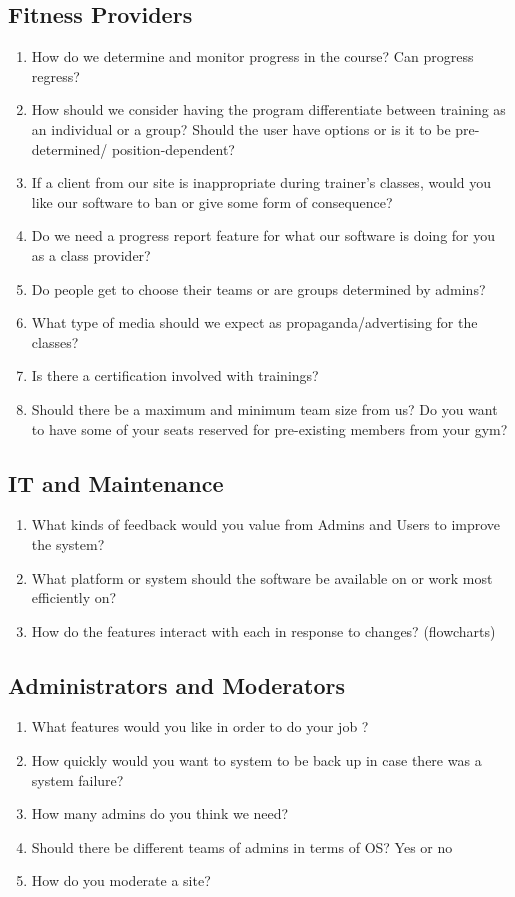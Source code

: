 \documentclass[12pt]{article}
\begin{document}
\subsection{Fitness Providers}
\begin{enumerate}
\item How do we determine and monitor progress in the course? Can progress regress?
\item How should we consider having the program differentiate between training as an individual or a group? Should the user have options or is it to be pre-determined/ position-dependent?
\item If a client from our site is inappropriate during trainer’s classes, would you like our software to ban or give some form of consequence?
\item Do we need a progress report feature for what our software is doing for you as a class provider? 
\item Do people get to choose their teams or are groups determined by admins? 
\item What type of media should we expect as propaganda/advertising for the classes? 
\item  Is there a certification involved with trainings?
\item Should there be a maximum and minimum team size from us? Do you want to have some of your seats reserved for pre-existing members from your gym?
\end{enumerate}
\subsection{IT and Maintenance}
\begin{enumerate}
\item What kinds of feedback would you value from Admins and Users to improve the system?
\item What platform or system should the software be available on or work most efficiently on?
\item How do the features interact with each in response to changes? (flowcharts)
\end{enumerate}
\subsection{Administrators and Moderators}
\begin{enumerate}
\item What features would you like in order to do your job ?
\item How quickly would you want to system to be back up in case there was a system failure?
\item How many admins do you think we need?
\item Should there be different teams of admins in terms of OS? Yes or no
\item How do you moderate a site?
\end{enumerate}
\end{document}

